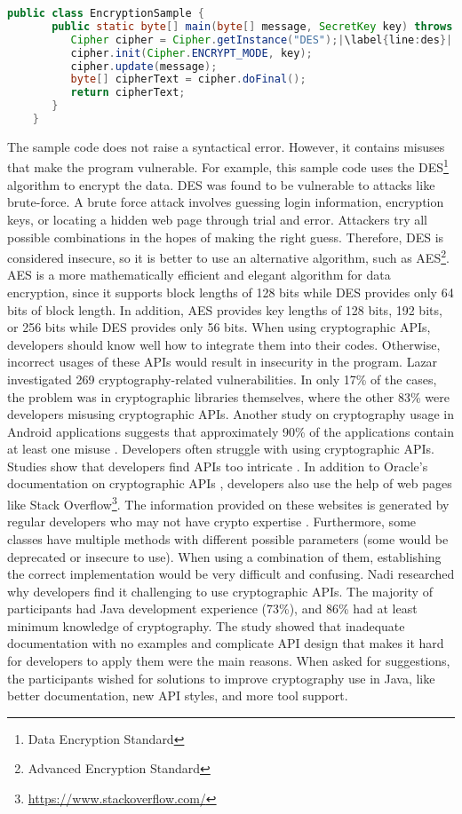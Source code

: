 \begin{lstlisting}[language=Java, caption=Sample code of message encryption using Cipher object., label={lst:codesample}, escapechar=|]
public class EncryptionSample {
	   public static byte[] main(byte[] message, SecretKey key) throws Exception{
	      Cipher cipher = Cipher.getInstance("DES");|\label{line:des}|
	      cipher.init(Cipher.ENCRYPT_MODE, key);
	      cipher.update(message);
	      byte[] cipherText = cipher.doFinal();
	      return cipherText;
	   }
	}
\end{lstlisting}
The sample code does not raise a syntactical error. However, it contains misuses that make the program vulnerable. For example, this sample code uses the DES\footnote{Data Encryption Standard} algorithm to encrypt the data. DES was found to be vulnerable to attacks like brute-force. A brute force attack involves guessing login information, encryption keys, or locating a hidden web page through trial and error. Attackers try all possible combinations in the hopes of making the right guess. Therefore, DES is considered insecure, so it is better to use an alternative algorithm, such as AES\footnote{Advanced Encryption Standard}. AES is a more mathematically efficient and elegant algorithm for data encryption, since it supports block lengths of 128 bits while DES provides only 64 bits of block length. In addition, AES provides key lengths of 128 bits, 192 bits, or 256 bits while DES provides only 56 bits. When using cryptographic APIs, developers should know well how to integrate them into their codes. Otherwise, incorrect usages of these APIs would result in insecurity in the program. Lazar \etal{}  \cite{dlz14} investigated 269 cryptography-related vulnerabilities. In only 17\% of the cases, the problem was in cryptographic libraries themselves, where the other 83\% were developers misusing cryptographic APIs. Another study on cryptography usage in Android applications suggests that approximately 90\% of the applications contain at least one misuse \cite{cx16}. Developers often struggle with using cryptographic APIs. Studies show that developers find APIs too intricate \cite{snb16}. In addition to Oracle's documentation on cryptographic APIs \cite{jca}, developers also use the help of web pages like Stack Overflow\footnote{\url{https://www.stackoverflow.com/}}. The information provided on these websites is generated by regular developers who may not have crypto expertise \cite{asw}. Furthermore, some classes have multiple methods with different possible parameters (some would be deprecated or insecure to use). When using a combination of them, establishing the correct implementation would be very difficult and confusing. Nadi \etal{} \cite{snb16} researched why developers find it challenging to use cryptographic APIs. The majority of participants had Java development experience (73\%), and 86\% had at least minimum knowledge of cryptography. The study showed that inadequate documentation with no examples and complicate API design that makes it hard for developers to apply them were the main reasons. When asked for suggestions, the participants wished for solutions to improve cryptography use in Java, like better documentation, new API styles, and more tool support.

